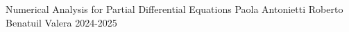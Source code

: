 \documentclass{classNotes}
\def\author{Roberto Benatuil Valera}
\def\prof{Paola Antonietti}
\def\course{Numerical Analysis for Partial Differential Equations}
\def\academicyear{2024-2025}
\begin{document}

\frontpage
    {\course}
    {\prof}
    {\author}
    {\academicyear}

\tableofcontents


\end{document}
